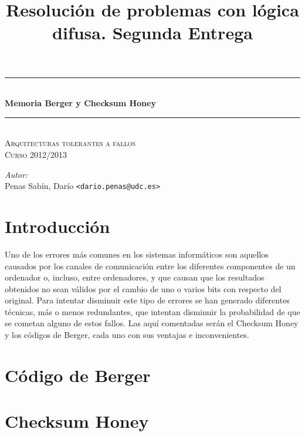 \documentclass[a4paper]{article}
\title{Resolución de problemas con lógica difusa. Segunda Entrega}
\newcommand{\HRule}{\rule{\linewidth}{0.5mm}}
\begin{document}
	\begin{titlepage}
		\begin{center}

			\HRule \\[0.4cm]
			{ \huge \bfseries Memoria Berger y Checksum Honey}\\[0.4cm]
			\HRule \\[0cm]

			\vspace{1cm}
			\textsc{\Large Arquitecturas tolerantes a fallos}\\[0.5cm]
			\textsc{\Large Curso 2012/2013}\\[0.5cm]
		\end{center}

		\vfill
		\hfill
		\emph{Autor:}
		\vspace{0.5cm}
		\\  
		\vspace{0.1cm}
		\hfill Penas Sabín, Darío \texttt{<dario.penas@udc.es>}\\
		\vspace{0.1cm}

	\end{titlepage}
\tableofcontents
\clearpage

\section{Introducción}
	Uno de los errores más comunes en los sistemas informáticos son aquellos causados por los canales de comunicación entre los diferentes componentes de un ordenador o, incluso, entre ordenadores, y que causan que los resultados obtenidos no sean válidos por el cambio de uno o varios bits con respecto del original. Para intentar disminuir este tipo de errores se han generado diferentes técnicas, más o menos redundantes, que intentan disminuir la probabilidad de que se cometan alguno de estos fallos.
	Las aquí comentadas serán el Checksum Honey y los códigos de Berger, cada uno con sus ventajas e inconvenientes.

\section{Código de Berger}



\section{Checksum Honey}
\end{document}
